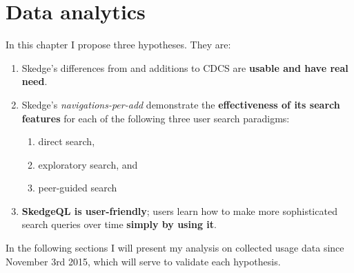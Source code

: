 
\chapter{Data analytics}

In this chapter I propose three hypotheses. They are:

\begin{enumerate}
  \item Skedge's differences from and additions to CDCS are \textbf{usable and have real need}.

  \item Skedge’s \emph{navigations-per-add} demonstrate the \textbf{effectiveness of its search features} for each of the following three user search paradigms:

  \begin{enumerate}
    \item direct search,
    \item exploratory search, and
    \item peer-guided search
  \end{enumerate}

  \item \textbf{SkedgeQL is user-friendly}; users learn how to make more sophisticated search queries over time \textbf{simply by using it}.
\end{enumerate}

\noindent In the following sections I will present my analysis on collected usage data since November 3rd 2015, which will serve to validate each hypothesis.


\clearpage


\clearpage


\clearpage

